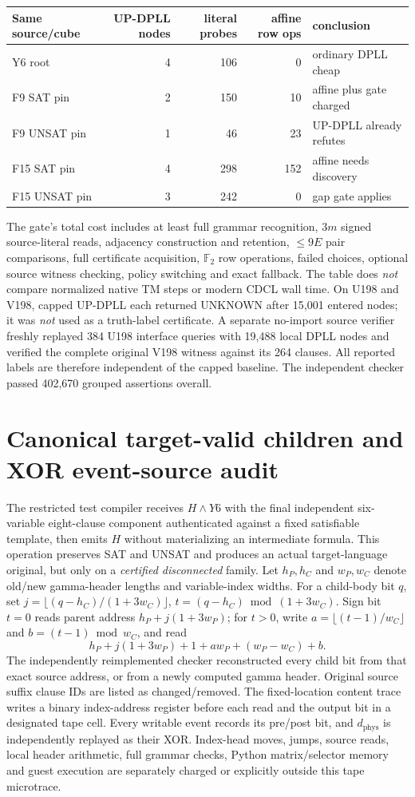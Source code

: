 \documentclass[11pt]{article}
\newcommand{\GF}{\mathbb F_2}
\begin{document}
\begin{center}\begin{tabular}{lrrrl}\toprule
Same source/cube & UP-DPLL nodes & literal probes & affine row ops & conclusion\\\midrule
Y6 root &4&106&0&ordinary DPLL cheap\\
F9 SAT pin &2&150&10&affine plus gate charged\\
F9 UNSAT pin &1&46&23&UP-DPLL already refutes\\
F15 SAT pin &4&298&152&affine needs discovery\\
F15 UNSAT pin &3&242&0&gap gate applies\\\bottomrule\end{tabular}\end{center}
The gate's total cost includes at least full grammar recognition, $3m$ signed source-literal reads, adjacency construction and retention, $\le9E$ pair comparisons, full certificate acquisition, $\GF$ row operations, failed choices, optional source witness checking, policy switching and exact fallback. The table does \emph{not} compare normalized native TM steps or modern CDCL wall time. On U198 and V198, capped UP-DPLL each returned UNKNOWN after 15,001 entered nodes; it was \emph{not} used as a truth-label certificate. A separate no-import source verifier freshly replayed 384 U198 interface queries with 19,488 local DPLL nodes and verified the complete original V198 witness against its 264 clauses. All reported labels are therefore independent of the capped baseline. The independent checker passed 402,670 grouped assertions overall.

\section{Canonical target-valid children and XOR event-source audit}
The restricted test compiler receives $H\land Y6$ with the final independent six-variable eight-clause component authenticated against a fixed satisfiable template, then emits $H$ without materializing an intermediate formula. This operation preserves SAT and UNSAT and produces an actual target-language original, but only on a \emph{certified disconnected} family. Let $h_P,h_C$ and $w_P,w_C$ denote old/new gamma-header lengths and variable-index widths. For a child-body bit $q$, set $j=\lfloor(q-h_C)/(1+3w_C)\rfloor$, $t=(q-h_C)\bmod(1+3w_C)$. Sign bit $t=0$ reads parent address $h_P+j(1+3w_P)$; for $t>0$, write $a=\lfloor(t-1)/w_C\rfloor$ and $b=(t-1)\bmod w_C$, and read
\[
\boxed{h_P+j(1+3w_P)+1+aw_P+(w_P-w_C)+b.}
\]
The independently reimplemented checker reconstructed every child bit from that exact source address, or from a newly computed gamma header. Original source suffix clause IDs are listed as changed/removed. The fixed-location content trace writes a binary index-address register before each read and the output bit in a designated tape cell. Every writable event records its pre/post bit, and $d_{\mathrm{phys}}$ is independently replayed as their XOR. Index-head moves, jumps, source reads, local header arithmetic, full grammar checks, Python matrix/selector memory and guest execution are separately charged or explicitly outside this tape microtrace.
\end{document}
